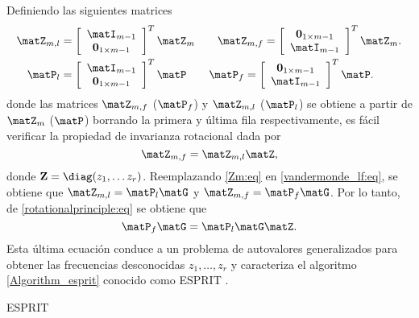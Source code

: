 	Definiendo las siguientes matrices
	\begin{align}
		\matZ_{m,l} &= \left[\begin{array}{c}
		\matI_{m-1} \\ \mathbf{0}_{1\times m-1}
		\end{array}\right]^T\matZ_m \qquad \matZ_{m,f} = \left[\begin{array}{c}\mathbf{0}_{1\times m-1} \\ \matI_{m-1}\end{array}\right]^T\matZ_m.
		\label{vandermonde_lf:eq}\\
		\matP_{l} &=\left[\begin{array}{c}
		\matI_{m-1} \\ \mathbf{0}_{1\times m-1}
		\end{array}\right]^T\matP \qquad \matP_{f} = \left[\begin{array}{c}\mathbf{0}_{1\times m-1} \\ \matI_{m-1}\end{array}\right]^T\matP. \nonumber
	\end{align}
	donde las matrices $\matZ_{m,f}$ ($\matP_f$) y $\matZ_{m,l}$ ($\matP_l$) se obtiene a partir de $\matZ_{m}$ ($\matP$) borrando la primera y última fila respectivamente, es fácil verificar la propiedad de invarianza rotacional dada por
	\begin{equation}
		\matZ_{m,f} = \matZ_{m,l}\matZ,
		\label{rotationalprinciple:eq}
	\end{equation}
	donde $\mathbf{Z} = \diag(z_1, \ldots z_r)$. Reemplazando \eqref{Zm:eq} en  \eqref{vandermonde_lf:eq}, se obtiene que  $\matZ_{m,l}  = \matP_l \matG$ y 
	$\matZ_{m,f}  = \matP_f \matG$. Por lo tanto, de \eqref{rotationalprinciple:eq} se obtiene que 
	\begin{equation}
		\matP_{f} \matG = \matP_{l}\matG\matZ. 
		\label{Esprit:eq}
	\end{equation}
	Esta última ecuación conduce a un problema de autovalores generalizados para obtener las frecuencias desconocidas $z_1,\ldots, z_r$ y caracteriza el algoritmo \eqref{Algorithm_esprit} conocido como ESPRIT  \cite{Roy1989}.

	\begin{algorithm}
		\caption{ESPRIT}
		\begin{algorithmic}[1]
		\end{algorithmic}
		\label{Algorithm_esprit}
	\end{algorithm}	

